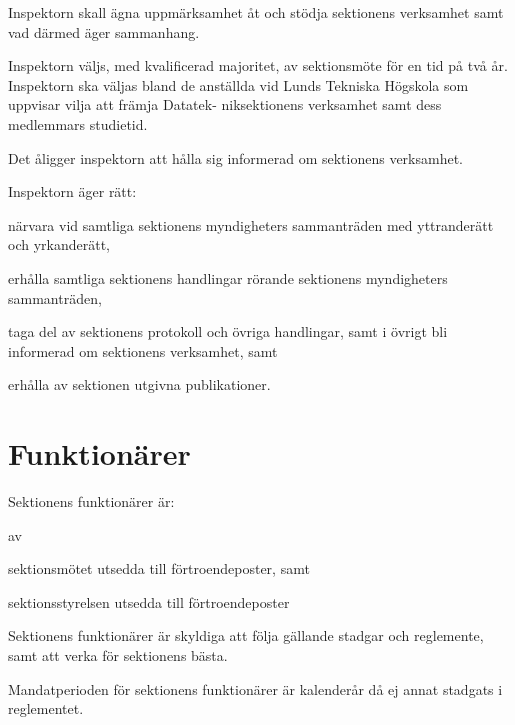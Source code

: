 \documentclass[stadgar]{dsekprotokoll}
\begin{document}
\begin{stadgeavsnitt}


Inspektorn skall ägna uppmärksamhet åt och stödja sektionens verksamhet
samt vad därmed äger sammanhang.

Inspektorn väljs, med kvalificerad majoritet, av sektionsmöte för en tid på två år. Inspektorn ska väljas bland de anställda vid Lunds Tekniska Högskola som uppvisar vilja att främja Datatek- niksektionens verksamhet samt dess medlemmars studietid.


Det åligger inspektorn att hålla sig informerad om sektionens verksamhet.


Inspektorn äger rätt:
\begin{attlista}
\item närvara vid samtliga sektionens myndigheters sammanträden med
  yttranderätt och yrkanderätt,
\item erhålla samtliga sektionens handlingar rörande sektionens
  myndigheters sammanträden,
\item taga del av sektionens protokoll och övriga handlingar, samt i övrigt
  bli informerad om sektionens verksamhet, samt
\item erhålla av sektionen utgivna publikationer.
\end{attlista}

\end{stadgeavsnitt}

\section{Funktionärer}

\begin{stadgeavsnitt}


Sektionens funktionärer är:
\begin{fetlista}{av}
\item sektionsmötet utsedda till förtroendeposter, samt
\item sektionsstyrelsen utsedda till förtroendeposter
\end{fetlista}


Sektionens funktionärer är skyldiga att följa gällande stadgar och
reglemente, samt att verka för sektionens bästa.


Mandatperioden för sektionens funktionärer är kalenderår då ej annat
stadgats i reglementet.

\end{stadgeavsnitt}
\end{document}
